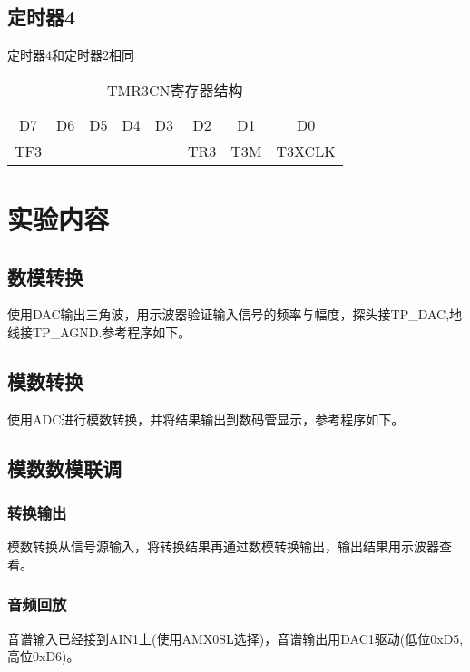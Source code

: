 \begin{CJK}
\begin{table}[!htbp]
\end{table}

\subsection{定时器4}
定时器4和定时器2相同
\begin{table}[!htbp]
  \centering
  \caption{TMR3CN寄存器结构}
  \begin{tabular}{|c|c|c|c|c|c|c|c|}
    \hline
    D7&D6&D5&D4&D3&D2&D1&D0\\
    TF3&&&&&TR3&T3M&T3XCLK\\
    \hline
  \end{tabular}

\end{table}
\section{实验内容}
\subsection{数模转换}
使用DAC输出三角波，用示波器验证输入信号的频率与幅度，探头接TP_DAC,地线接TP_AGND.参考程序如下。
  \vspace{5mm}
	
	\vspace{3mm}

\subsection{模数转换}
使用ADC进行模数转换，并将结果输出到数码管显示，参考程序如下。
	\vspace{5mm}
	\vspace{3mm}

\subsection{模数数模联调}
\subsubsection{转换输出}
模数转换从信号源输入，将转换结果再通过数模转换输出，输出结果用示波器查看。
\subsubsection{音频回放}
音谱输入已经接到AIN1上(使用AMX0SL选择)，音谱输出用DAC1驱动(低位0xD5,高位0xD6)。


\end{CJK}
